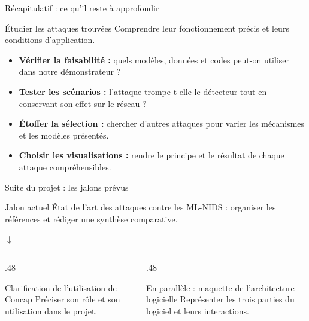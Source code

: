\documentclass[aspectratio=169,11pt]{beamer}
\begin{document}
\begin{frame}{Récapitulatif : ce qu'il reste à approfondir}
  \begin{block}{Étudier les attaques trouvées}
    Comprendre leur fonctionnement précis et leurs conditions d'application.
  \end{block}
  \begin{itemize}
    \setlength{\itemsep}{.8em}
    \item \textbf{Vérifier la faisabilité :} quels modèles, données et codes
      peut-on utiliser dans notre démonstrateur ?
    \item \textbf{Tester les scénarios :} l'attaque trompe-t-elle le détecteur
      tout en conservant son effet sur le réseau ?
    \item \textbf{Étoffer la sélection :} chercher d'autres attaques pour varier
      les mécanismes et les modèles présentés.
    \item \textbf{Choisir les visualisations :} rendre le principe et le résultat
      de chaque attaque compréhensibles.
  \end{itemize}
\end{frame}

\begin{frame}{Suite du projet : les jalons prévus}
  \begin{block}{Jalon actuel}
    État de l'art des attaques contre les ML-NIDS : organiser les références
    et rédiger une synthèse comparative.
  \end{block}
  \begin{center}
    {\Large $\downarrow$}
  \end{center}
  \begin{columns}[T,onlytextwidth]
    \begin{column}{.48\textwidth}
      \begin{block}{Clarification de l'utilisation de Concap}
        Préciser son rôle et son utilisation dans le projet.
      \end{block}
    \end{column}
    \begin{column}{.48\textwidth}
      \begin{block}{En parallèle : maquette de l'architecture logicielle}
        Représenter les trois parties du logiciel et leurs interactions.
      \end{block}
    \end{column}
  \end{columns}
\end{frame}
\end{document}
